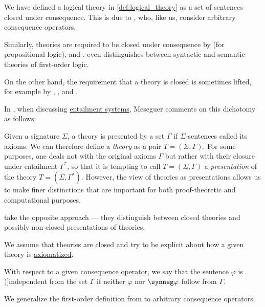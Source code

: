 \begin{remark}\label{rem:logical_theory_closed}
  We have defined a logical theory in \cref{def:logical_theory} as a set of sentences closed under consequence. This is due to \textcite[96]{CitkinMuravitsky2022ConsequenceRelations}, who, like us, consider arbitrary consequence operators.

  Similarly, theories are required to be closed under consequence by \textcite[def. 1.4.5]{Hinman2005Logic} (for propositional logic), \textcite[def. 3.1.4(i)]{VanDalen2004LogicAndStructure} and \textcite[21]{Andrews2002Logic}. \Textcite{Эдельман1975Логика} even distinguishes between syntactic and semantic theories of first-order logic.

  On the other hand, the requirement that a theory is closed is sometimes lifted, for example by \textcite[7]{TroelstraSchwichtenberg2000BasicProofTheory}, \textcite[def. 1.3.1]{TentZiegler2012ModelTheory}, \textcite[def. 3.1.1]{Герасимов2014Вычислимость} and \textcite[146]{ШеньВерещагин2017ЯзыкиИИсчисления}.

  In \cite[284]{Meseguer1989GeneralLogics}, when discussing \hyperref[def:entailment_system]{entailment systems}, Meseguer comments on this dichotomy as follows:
  \begin{displayquote}
    Given a signature \( \Sigma \), a theory is presented by a set \( \Gamma \) if \( \Sigma \)-sentences called its axioms. We can therefore define a \textit{theory} as a pair \( T = (\Sigma, \Gamma) \). For some purposes, one deals not with the original axioms \( \Gamma \) but rather with their closure under entailment \( \Gamma^* \), so that it is tempting to call \( T = (\Sigma, \Gamma) \) a \textit{presentation} of the theory \( T = (\Sigma, \Gamma^*) \). However, the view of theories as presentations allows us to make finer distinctions that are important for both proof-theoretic and computational purposes.
  \end{displayquote}

  \textcite[def. 2]{GoguenBurstall1992Institutions} take the opposite approach --- they distinguish between closed theories and possibly non-closed presentations of theories.

  We assume that theories are closed and try to be explicit about how a given theory is \hyperref[def:logical_theory]{axiomatized}.
\end{remark}

\begin{definition}\label{def:logical_independence}\mimprovised
  With respect to a given \hyperref[def:consequence_operator]{consequence operator}, we say that the sentence \( \varphi \) is \term[en=independent (formula) (\cite[exerc. 1.5.3]{VanDalen2004LogicAndStructure})]{independent} from the set \( \Gamma \) if neither \( \varphi \) nor \( \synneg \varphi \) follow from \( \Gamma \).
\end{definition}
\begin{comments}
  \item We generalize the first-order definition from \cite[exerc. 1.5.3]{VanDalen2004LogicAndStructure} to arbitrary consequence operators.
\end{comments}

